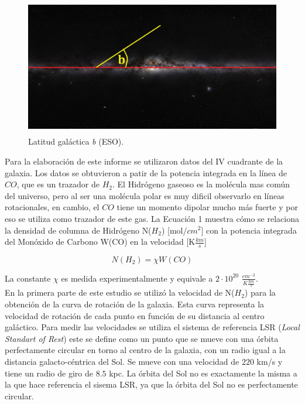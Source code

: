\documentclass[letterpaper,oneside]{article}
\begin{document}
\begin{figure}
  \centering
  \includegraphics[height=6cm]{../graficos/imagenes/plano_galactico.jpg}
  \caption{Latitud galáctica \emph{b} (ESO).}
\end{figure}

Para la elaboración de este informe se utilizaron datos del IV cuadrante de la galaxia. Los datos se obtuvieron a patir de la potencia integrada en la línea de $CO$, que es un trazador de $H_2$. El Hidrógeno gaseoso es la molécula mas común del universo, pero al ser una molécula polar es muy dificil observarlo en líneas rotacionales, en cambio, el $CO$ tiene un momento dipolar mucho más fuerte y por eso se utiliza como trazador de este gas. La Ecuación 1 muestra cómo se relaciona la densidad de columna de Hidrógeno N($H_2$) [mol/$cm^2$] con la potencia integrada del Monóxido de Carbono W(CO) en la velocidad [K$\frac{km}{s}$]

\begin{equation}
    N(H_2) = \chi W(CO)
\end{equation}

La constante $\chi$ es medida experimentalmente y equivale a $2 \cdot 10^{20}$ $\frac{cm^{-2}}{K\frac{km}{s}}$.\\

En la primera parte de este estudio se utilizó la velocidad de N($H_2$) para la obtención de la curva de rotación de la galaxia. Esta curva representa la velocidad de rotación de cada punto en función de su distancia al centro galáctico. Para medir las velocidades se utiliza el sistema de referencia LSR (\emph{Local Standart of Rest}) este se define como un punto que se mueve con una órbita perfectamente circular en torno al centro de la galaxia, con un radio igual a la distancia galacto-céntrica del Sol. Se mueve con una velocidad de $220$ km/s y tiene un radio de giro de $8.5$ kpc. La órbita del Sol no es exactamente la misma a la que hace referencia el sisema LSR, ya que la órbita del Sol no es perfectamente circular.\\
\end{document}
